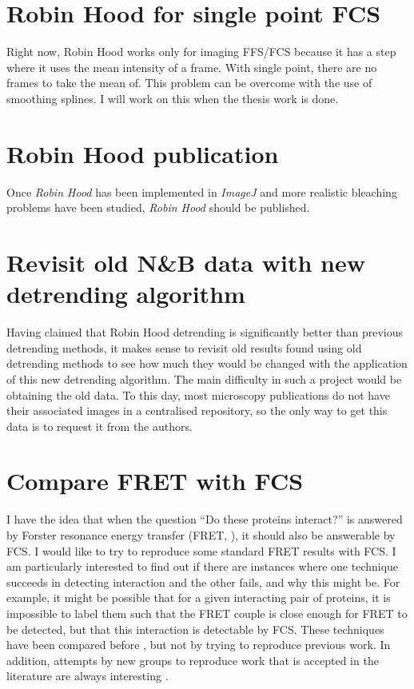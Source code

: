 \documentclass[12pt,]{book}
\theoremstyle{definition}
\theoremstyle{definition}
\theoremstyle{definition}
\theoremstyle{remark}
\begin{document}
\section{Robin Hood for single point
FCS}\label{robin-hood-for-single-point-fcs}

Right now, Robin Hood works only for imaging FFS/FCS because it has a
step where it uses the mean intensity of a frame. With single point,
there are no frames to take the mean of. This problem can be overcome
with the use of smoothing splines. I will work on this when the thesis
work is done.

\section{Robin Hood publication}\label{robin-hood-publication}

Once \emph{Robin Hood} has been implemented in \emph{ImageJ} and more
realistic bleaching problems have been studied, \emph{Robin Hood} should
be published.

\section{Revisit old N\&B data with new detrending
algorithm}\label{revisit-old-nb-data-with-new-detrending-algorithm}

Having claimed that Robin Hood detrending is significantly better than
previous detrending methods, it makes sense to revisit old results found
using old detrending methods to see how much they would be changed with
the application of this new detrending algorithm. The main difficulty in
such a project would be obtaining the old data. To this day, most
microscopy publications do not have their associated images in a
centralised repository, so the only way to get this data is to request
it from the authors.

\section{Compare FRET with FCS}\label{compare-fret-with-fcs}

I have the idea that when the question ``Do these proteins interact?''
is answered by Forster resonance energy transfer (FRET, \citet{Frster}),
it should also be answerable by FCS. I would like to try to reproduce
some standard FRET results with FCS. I am particularly interested to
find out if there are instances where one technique succeeds in
detecting interaction and the other fails, and why this might be. For
example, it might be possible that for a given interacting pair of
proteins, it is impossible to label them such that the FRET couple is
close enough for FRET to be detected, but that this interaction is
detectable by FCS. These techniques have been compared before
\citep{Sahoo}, but not by trying to reproduce previous work. In
addition, attempts by new groups to reproduce work that is accepted in
the literature are always interesting \citep{Baker2016}.


\end{document}
